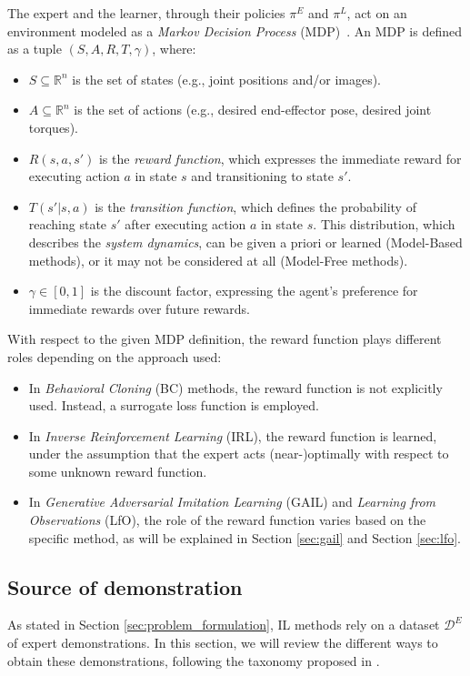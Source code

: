 The expert and the learner, through their policies $\pi^{E}$ and $\pi^{L}$, act on an environment modeled as a \textit{Markov Decision Process} (MDP)~\cite{kroemer2021review_robot_learning}. An MDP is defined as a tuple $(S, A, R, T, \gamma)$, where:
\begin{itemize}
    \item $S \subseteq \mathbb{R}^{n}$ is the set of states (e.g., joint positions and/or images).
    \item $A \subseteq \mathbb{R}^{n}$ is the set of actions (e.g., desired end-effector pose, desired joint torques).
    \item $R(s, a, s')$ is the \textit{reward function}, which expresses the immediate reward for executing action $a$ in state $s$ and transitioning to state $s'$.
    \item $T(s' | s, a)$ is the \textit{transition function}, which defines the probability of reaching state $s'$ after executing action $a$ in state $s$. This distribution, which describes the \textit{system dynamics}, can be given a priori or learned (Model-Based methods), or it may not be considered at all (Model-Free methods).
    \item $\gamma \in [0,1]$ is the discount factor, expressing the agent's preference for immediate rewards over future rewards.
\end{itemize}

With respect to the given MDP definition, the reward function plays different roles depending on the approach used:
\begin{itemize}
    \item In \textit{Behavioral Cloning} (BC) methods, the reward function is not explicitly used. Instead, a surrogate loss function is employed.
    \item In \textit{Inverse Reinforcement Learning} (IRL), the reward function is learned, under the assumption that the expert acts (near-)optimally with respect to some unknown reward function.
    \item In \textit{Generative Adversarial Imitation Learning} (GAIL) and \textit{Learning from Observations} (LfO), the role of the reward function varies based on the specific method, as will be explained in Section \ref{sec:gail} and Section \ref{sec:lfo}.
\end{itemize}



\subsection{Source of demonstration}
\label{sec:sod}
As stated in Section \ref{sec:problem_formulation}, IL methods rely on a dataset $\mathcal{D}^{E}$ of expert demonstrations. In this section, we will review the different ways to obtain these demonstrations, following the taxonomy proposed in \cite{fang2019survey}.

